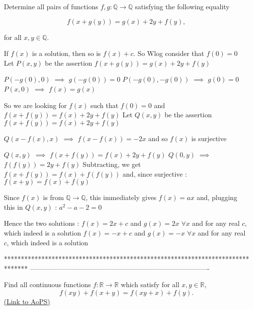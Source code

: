 \begin{solution}
	\begin{tcolorbox}Determine all pairs of functions $f,g:\mathbb{Q} \rightarrow \mathbb{Q}$ satisfying the following equality

\[ \displaystyle{ f(x+g(y))=g(x)+2y+f(y), }\]

for all  $x,y \in \mathbb{Q}.$\end{tcolorbox}
If $f(x)$ is a solution, then so is $f(x)+c$. So Wlog consider that $f(0)=0$
Let $P(x,y)$ be the assertion $f(x+g(y))=g(x)+2y+f(y)$

$P(-g(0),0)$ $\implies$ $g(-g(0))=0$
$P(-g(0),-g(0))$ $\implies$ $g(0)=0$
$P(x,0)$ $\implies$ $f(x)=g(x)$

So we are looking for $f(x)$ such that $f(0)=0$ and $f(x+f(y))=f(x)+2y+f(y)$
Let $Q(x,y)$ be the assertion $f(x+f(y))=f(x)+2y+f(y)$

$Q(x-f(x),x)$ $\implies$ $f(x-f(x))=-2x$ and so $f(x)$ is surjective

$Q(x,y)$ $\implies$ $f(x+f(y))=f(x)+2y+f(y)$
$Q(0,y)$ $\implies$ $f(f(y))=2y+f(y)$
Subtracting, we get $f(x+f(y))=f(x)+f(f(y))$ and, since surjective : $f(x+y)=f(x)+f(y)$

Since $f(x)$ is from $\mathbb Q\to\mathbb Q$, this immediately gives $f(x)=ax$ and, plugging this in $Q(x,y)$ : $a^2-a-2=0$

Hence the two solutions :
$f(x)=2x+c$ and $g(x)=2x$ $\forall x$ and for any real $c$, which indeed is a solution
$f(x)=-x+c$ and $g(x)=-x$ $\forall x$ and for any real $c$, which indeed is a solution
\end{solution}
*******************************************************************************
-------------------------------------------------------------------------------

\begin{problem}
	Find all continuous functions $f: \mathbb R \to \mathbb R$ which satisfy for all $x, y \in \mathbb R$,
\[f(xy) + f(x+y) = f(xy+x) + f(y).\]
	\flushright \href{https://artofproblemsolving.com/community/c6h429068}{(Link to AoPS)}
\end{problem}




